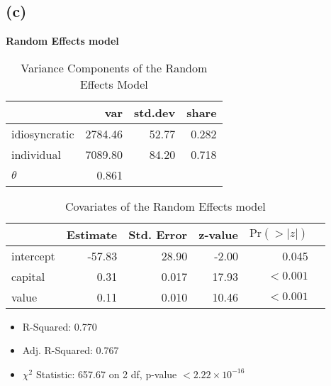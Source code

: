 \documentclass[a4paper]{article}
\begin{document}
\subsection*{(c)}
\textbf{Random Effects model}
\begin{table}[ht]
    \centering
    \begin{tabular}{lrrr}
        \toprule
            & var & std.dev & share \\
            \midrule
    idiosyncratic & 2784.46 & 52.77 & 0.282 \\
    individual    & 7089.80 & 84.20 & 0.718 \\
    \midrule
    \(\theta\) &0.861\\
    \bottomrule        
    \end{tabular}    
    \caption{Variance Components of the Random Effects Model}
\end{table}
\begin{table}[ht]
    \centering
    \begin{tabular}{@{}lrrrrr@{}}
        \toprule
                & Estimate  & Std. Error  & z-value & \(\text{Pr}(>|z|)\)\\
                \midrule
        intercept & -57.83 & 28.90 & -2.00 & 0.045 \\
        capital   & 0.31   & 0.017 & 17.93  & \(<0.001\)\\
        value     & 0.11   & 0.010 & 10.46 & \(<0.001\)\\
        \bottomrule
    \end{tabular}
    \caption{Covariates of the Random Effects model}
\end{table}
\begin{itemize}
    \item R-Squared: 0.770
    \item Adj. R-Squared: 0.767
    \item \(\chi^2\) Statistic: 657.67 on 2 df, p-value \(<2.22 \times 10^{-16}\) 
\end{itemize}



\end{document}
